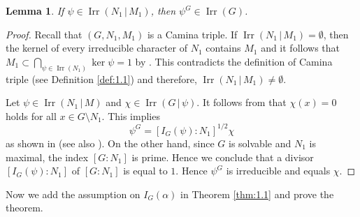 \documentclass[a4paper,12pt]{article}
\newtheorem{lemma}[theorem]{Lemma}
\theoremstyle{definition}
\theoremstyle{remark}
\DeclareMathOperator{\irr}{Irr}
\numberwithin{equation}{section}
\begin{document}
\begin{lemma} \label{lem:3.1}
  If $\psi \in \irr (N_1  \,|\, M_1)$, then $\psi^G \in \irr (G)$.
\end{lemma}
\begin{proof}
Recall that $(G,N_1,M_1)$ is a Camina triple. If $\irr (N_1 \,|\,  M_1) = \emptyset$, then
the kernel of every irreducible character of $N_1$ contains $M_1$ and it follows that 
$\displaystyle M_1 \subset \bigcap_{\psi \in \irr (N_1)} \ker \psi =1$ by \cite[Lemma 2.21]{MR0460423}. 
This contradicts the definition of Camina triple (see Definition \ref{def:1.1}) 
and therefore, $\irr (N_1 \,|\,  M_1) \neq \emptyset$.

Let $\psi \in \irr (N_1  \,|\, M)$ and $\chi \in \irr (G \,|\, \psi )$. 
It follows from \cite[Lemma 5.1]{MR4166586} that 
$\chi (x) =0 $ holds for all $x \in G \setminus N_1$. This implies 
\[ \psi^G = [I_G (\psi ) : N_1]^{1/2} \chi  \] 
 as shown in \cite[Lemma 5.2]{MR4166586} (see also \cite[Theorem 3.1]{MR3150725}).
On the other hand, since $G$ is solvable and $N_1$ is maximal, the index $[G:N_1]$ is prime. Hence we conclude that a divisor $[I_G (\psi ) : N_1]$ of $[G:N_1]$ is equal to $1$.
 Hence $\psi^G$ is irreducible and equals $\chi $.
\end{proof}

Now we add the assumption on $I_G (\alpha ) $ in Theorem \ref{thm:1.1} and prove the theorem.
\end{document}
